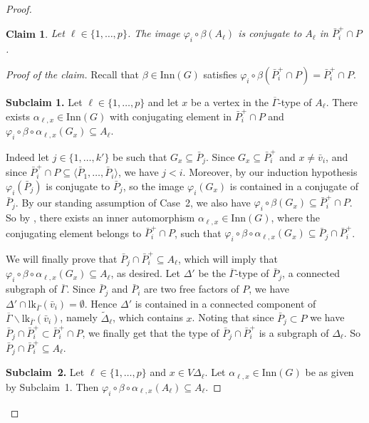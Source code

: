 \documentclass[a4paper,english,11pt]{article}
\newtheorem{claim}[de]{Claim}
\theoremstyle{definition}
\theoremstyle{remark}
\newcommand{\lk}{\mathrm{lk}}
\newcommand{\Inn}{\mathrm{Inn}}
\begin{document}
\begin{proof}
\begin{claim}\label{claim:complement-star}
Let $\ell\in\{1,\dots,p\}$. The image $\varphi_i\circ\beta(A_\ell)$ is conjugate to $A_\ell$ in $\bar P_i^+\cap P$.
\end{claim}

\begin{proof}[Proof of the claim] 
Recall that $\beta\in\Inn(G)$ satisfies $\varphi_i\circ\beta(\bar P_i^+\cap P)=\bar P_i^+\cap P$.
\medskip
 
    \textbf{Subclaim 1.} 
    Let $\ell\in\{1,\dots,p\}$ and let $x$ be a vertex in the $\overline{\Gamma}$-type of $A_\ell$. There exists $\alpha_{\ell,x}\in \mathrm{Inn}(G)$ with conjugating element in $\bar P_i^+\cap P$ and $\varphi_i\circ \beta\circ \alpha_{\ell,x}(G_x)\subseteq A_\ell$.
    
    \smallskip

    Indeed let $j\in\{1,\dots,k'\}$ be such that $G_x\subseteq \bar P_j$. Since $G_x\subseteq \bar{P}_i^+$ and $x\neq \bar{v}_i$, and since $\bar P_i^+\cap P\subseteq \langle \bar P_1,\dots,\bar P_i\rangle$, we have $j<i$. Moreover, by our induction hypothesis $\varphi_i(\bar P_j)$ is conjugate to $\bar P_j$, so the image $\varphi_i(G_x)$ is contained in a conjugate of $\bar P_j$. By our standing assumption of Case~2, we also have $\varphi_i\circ\beta(G_x)\subseteq \bar P_i^+\cap P$. So by \cite[Proposition~3.4]{AM}, there exists an inner automorphism $\alpha_{\ell,x}\in\mathrm{Inn}(G)$, where the conjugating element belongs to $\bar P_i^+\cap P$, such that $\varphi_i\circ\beta\circ\alpha_{\ell,x}(G_x)\subseteq \bar P_j\cap \bar P_i^+$.  
    
    We will finally prove that $\bar P_j\cap\bar P_i^+\subseteq A_\ell$, which will imply that $\varphi_i\circ\beta\circ\alpha_{\ell,x}(G_x)\subseteq A_\ell$, as desired. Let $\Delta'$ be the $\overline{\Gamma}$-type of $\bar{P}_j$, a connected subgraph of $\overline{\Gamma}$. Since $\bar{P}_j$ and $\bar{P}_i$ are two free factors of $P$, we have $\Delta'\cap \lk_{\overline{\Gamma}}(\bar{v}_i)=\emptyset$. Hence $\Delta'$ is contained in a connected component of $\overline{\Gamma}\backslash \lk_{\overline{\Gamma}}(\bar{v}_i)$, namely $\tilde{\Delta}_\ell$, which contains $x$. Noting that since $\bar{P}_j\subset P$ we have $\bar{P}_j\cap \bar P^+_i \subset \bar{P}^+_i\cap P$, we finally get that the type of $\bar P_j\cap\bar P_i^+$ is a subgraph of $\Delta_\ell$.
    So $\bar P_j\cap \bar P_i^+\subseteq A_\ell$. \medskip
    
    \textbf{Subclaim~2.} Let $\ell\in\{1,\dots,p\}$ and $x\in V\Delta_\ell$. Let $\alpha_{\ell,x}\in\Inn(G)$ be as given by Subclaim~1. Then $\varphi_i\circ\beta\circ\alpha_{\ell,x}(A_\ell)\subseteq A_\ell$.
    \smallskip
    

\end{proof}
\end{proof}
\end{document}
